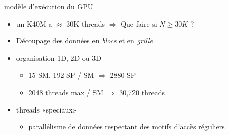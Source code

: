 \documentclass[11pt,mathserif]{beamer}
\begin{document}
\begin{frame}{modèle d'exécution du GPU}
 \pause
 \begin{minipage}[c]{0.49\linewidth}
  \begin{itemize}[<+->]
    \item un K40M a $\approx$ 30K threads $\Rightarrow$ Que faire si $N \geq 30K$ ?
    \item Découpage des données en {\em blocs } et en {\em grille}
    \item organisation 1D, 2D ou 3D
      \begin{itemize}
        \item 15 SM, 192 SP / SM $\Rightarrow$ 2880 SP
        \item 2048 threads max / SM $\Rightarrow$ 30,720 threads
      \end{itemize}
    \item threads «speciaux»
      \begin{itemize}
        \item parallélisme de données respectant des motifs d'accès réguliers
      \end{itemize}
  \end{itemize}
\end{minipage}
\begin{minipage}[c]{0.49\linewidth}
\begin{center}
\end{center}
\end{minipage}
\end{frame}
\end{document}
